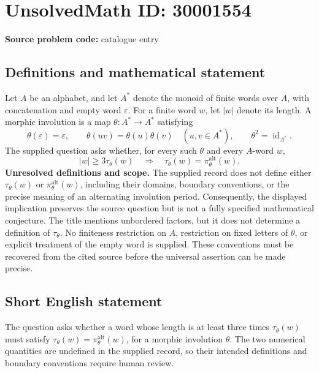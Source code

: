 \documentclass[11pt]{article}
\begin{document}
\section*{UnsolvedMath ID: 30001554}
\textbf{Source problem code:} catalogue entry
\subsection{Definitions and mathematical statement}
Let \(A\) be an alphabet, and let \(A^*\) denote the monoid of finite words over \(A\), with concatenation and empty word \(\varepsilon\). For a finite word \(w\), let \(|w|\) denote its length. A morphic involution is a map \(\theta:A^*\to A^*\) satisfying
\[
\theta(\varepsilon)=\varepsilon,\qquad
\theta(uv)=\theta(u)\theta(v)\quad(u,v\in A^*),\qquad
\theta^2=\operatorname{id}_{A^*}.
\]
The supplied question asks whether, for every such \(\theta\) and every \(A\)-word \(w\),
\[
|w|\geq 3\tau_\theta(w)
\quad\Longrightarrow\quad
\tau_\theta(w)=\pi_\theta^{\mathrm{alt}}(w).
\]
\textbf{Unresolved definitions and scope.} The supplied record does not define either \(\tau_\theta(w)\) or \(\pi_\theta^{\mathrm{alt}}(w)\), including their domains, boundary conventions, or the precise meaning of an alternating involution period. Consequently, the displayed implication preserves the source question but is not a fully specified mathematical conjecture. The title mentions unbordered factors, but it does not determine a definition of \(\tau_\theta\). No finiteness restriction on \(A\), restriction on fixed letters of \(\theta\), or explicit treatment of the empty word is supplied. These conventions must be recovered from the cited source before the universal assertion can be made precise.
\subsection{Short English statement}
The question asks whether a word whose length is at least three times \(\tau_\theta(w)\) must satisfy \(\tau_\theta(w)=\pi_\theta^{\mathrm{alt}}(w)\), for a morphic involution \(\theta\). The two numerical quantities are undefined in the supplied record, so their intended definitions and boundary conventions require human review.
\end{document}
